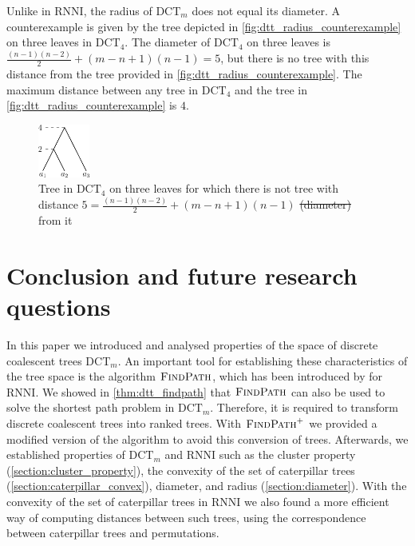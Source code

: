 \documentclass[11pt]{amsart}
\newcommand{\rnni}{\mathrm{RNNI}}
\newcommand{\findpath}{\textsc{FindPath}}
\newcommand{\dct}{\mathrm{DCT}}
\newcommand{\summary}[1]{} %
\providecommand{\DIFaddtex}[1]{{\protect\color{blue}\uwave{#1}}} %
\providecommand{\DIFdeltex}[1]{{\protect\color{red}\sout{#1}}}                      %
\providecommand{\DIFaddFL}[1]{\DIFadd{#1}} %
\providecommand{\DIFdelFL}[1]{\DIFdel{#1}} %
\providecommand{\DIFaddbeginFL}{} %
\providecommand{\DIFaddendFL}{} %
\providecommand{\DIFdelbeginFL}{} %
\providecommand{\DIFdelendFL}{} %
\providecommand{\DIFadd}[1]{\texorpdfstring{\DIFaddtex{#1}}{#1}} %
\providecommand{\DIFdel}[1]{\texorpdfstring{\DIFdeltex{#1}}{}} %
\newcommand{\DIFscaledelfig}{0.5}
\newlength{\DIFdelgraphicswidth} %
\newlength{\DIFdelgraphicsheight} %
\newcommand{\DIFaddincludegraphics}[2][]{{\color{blue}\fbox{\DIFOincludegraphics[#1]{#2}}}} %
\newcommand{\DIFdelincludegraphics}[2][]{%
\sbox{\DIFdelgraphicsbox}{\DIFOincludegraphics[#1]{#2}}%
\settoboxwidth{\DIFdelgraphicswidth}{\DIFdelgraphicsbox} %
\settoboxtotalheight{\DIFdelgraphicsheight}{\DIFdelgraphicsbox} %
\scalebox{\DIFscaledelfig}{%
\parbox[b]{\DIFdelgraphicswidth}{\usebox{\DIFdelgraphicsbox}\\[-\baselineskip] \rule{\DIFdelgraphicswidth}{0em}}\llap{\resizebox{\DIFdelgraphicswidth}{\DIFdelgraphicsheight}{%
\setlength{\unitlength}{\DIFdelgraphicswidth}%
\begin{picture}(1,1)%
\thicklines\linethickness{2pt} %
{\color[rgb]{1,0,0}\put(0,0){\framebox(1,1){}}}%
{\color[rgb]{1,0,0}\put(0,0){\line( 1,1){1}}}%
{\color[rgb]{1,0,0}\put(0,1){\line(1,-1){1}}}%
\end{picture}%
}\hspace*{3pt}}} %
} %
\DeclareRobustCommand{\DIFaddbeginFL}{\DIFOaddbeginFL \let\includegraphics\DIFaddincludegraphics} %
\DeclareRobustCommand{\DIFaddendFL}{\DIFOaddendFL \let\includegraphics\DIFOincludegraphics} %
\DeclareRobustCommand{\DIFdelbeginFL}{\DIFOdelbeginFL \let\includegraphics\DIFdelincludegraphics} %
\DeclareRobustCommand{\DIFdelendFL}{\DIFOaddendFL \let\includegraphics\DIFOincludegraphics} %
\begin{document}
Unlike in $\rnni$, the radius of $\dct_m$ does not equal its diameter.
A counterexample is given by the tree depicted in \autoref{fig:dtt_radius_counterexample} on three leaves in $\dct_4$.
The diameter of $\dct_4$ on three leaves is $\frac{(n-1)(n-2)}{2} + (m-n+1)(n-1) = 5$, but there is no tree with this distance from the tree provided in \autoref{fig:dtt_radius_counterexample}.
The maximum distance between any tree in $\dct_4$ and the tree in \autoref{fig:dtt_radius_counterexample} is $4$.

\begin{figure}[ht]
	\includegraphics[width=0.15\textwidth]{dtt_radius_counterexample.eps}
	\caption{Tree in $\dct_4$ on three leaves for which there is not tree with \DIFaddbeginFL \DIFaddFL{diameter }\DIFaddendFL distance $5 = \frac{(n-1)(n-2)}{2} + (m-n+1)(n-1)$ \DIFdelbeginFL \DIFdelFL{(diameter) }\DIFdelendFL from it}
	\label{fig:dtt_radius_counterexample}
\end{figure}


\section{Conclusion and future research questions}
\label{section:open_problems}

\summary{Brief summary of results of the paper}
In this paper we introduced and analysed properties of the space of discrete coalescent trees $\dct_m$.
An important tool for establishing these characteristics of the tree space is the algorithm $\findpath$, which has been introduced by \textcite{Collienne2021} for $\rnni$.
We showed in \autoref{thm:dtt_findpath} that $\findpath$ can also be used to solve the shortest path problem in $\dct_m$.
Therefore, it is required to transform discrete coalescent trees into ranked trees.
With $\findpath^+$ we provided a modified version of the algorithm to avoid this conversion of trees.
Afterwards, we established properties of $\dct_m$ and $\rnni$ such as the cluster property (\autoref{section:cluster_property}), the convexity of the set of caterpillar trees (\autoref{section:caterpillar_convex}), diameter, and radius (\autoref{section:diameter}).
With the convexity of the set of caterpillar trees in $\rnni$ we also found a more efficient way of computing distances between such trees, using the correspondence between caterpillar trees and permutations.
\end{document}
